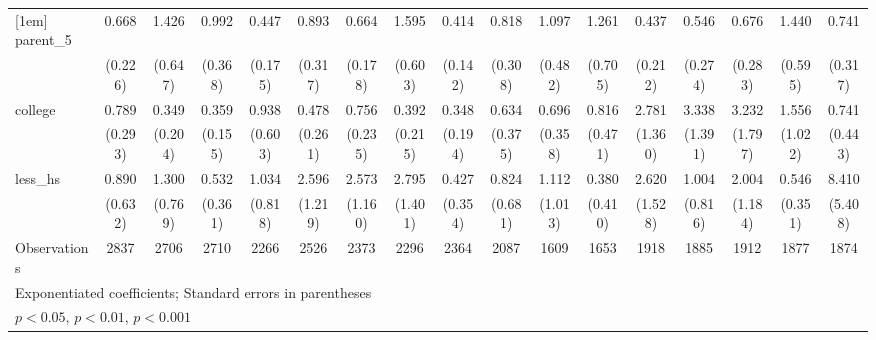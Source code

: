 {\begin{tabular}{l*{16}{c}}
[1em]
parent\_5            &       0.668         &       1.426         &       0.992         &       0.447\sym{*}  &       0.893         &       0.664         &       1.595         &       0.414\sym{*}  &       0.818         &       1.097         &       1.261         &       0.437         &       0.546         &       0.676         &       1.440         &       0.741         \\
                    &     (0.226)         &     (0.647)         &     (0.368)         &     (0.175)         &     (0.317)         &     (0.178)         &     (0.603)         &     (0.142)         &     (0.308)         &     (0.482)         &     (0.705)         &     (0.212)         &     (0.274)         &     (0.283)         &     (0.595)         &     (0.317)         \\
[1em]
college             &       0.789         &       0.349         &       0.359\sym{*}  &       0.938         &       0.478         &       0.756         &       0.392         &       0.348         &       0.634         &       0.696         &       0.816         &       2.781\sym{*}  &       3.338\sym{**} &       3.232\sym{*}  &       1.556         &       0.741         \\
                    &     (0.293)         &     (0.204)         &     (0.155)         &     (0.603)         &     (0.261)         &     (0.235)         &     (0.215)         &     (0.194)         &     (0.375)         &     (0.358)         &     (0.471)         &     (1.360)         &     (1.391)         &     (1.797)         &     (1.022)         &     (0.443)         \\
[1em]
less\_hs             &       0.890         &       1.300         &       0.532         &       1.034         &       2.596\sym{*}  &       2.573\sym{*}  &       2.795\sym{*}  &       0.427         &       0.824         &       1.112         &       0.380         &       2.620         &       1.004         &       2.004         &       0.546         &       8.410\sym{***}\\
                    &     (0.632)         &     (0.769)         &     (0.361)         &     (0.818)         &     (1.219)         &     (1.160)         &     (1.401)         &     (0.354)         &     (0.681)         &     (1.013)         &     (0.410)         &     (1.528)         &     (0.816)         &     (1.184)         &     (0.351)         &     (5.408)         \\
\hline
Observations        &        2837         &        2706         &        2710         &        2266         &        2526         &        2373         &        2296         &        2364         &        2087         &        1609         &        1653         &        1918         &        1885         &        1912         &        1877         &        1874         \\
\hline\hline
\multicolumn{17}{l}{\footnotesize Exponentiated coefficients; Standard errors in parentheses}\\
\multicolumn{17}{l}{\footnotesize \sym{*} \(p<0.05\), \sym{**} \(p<0.01\), \sym{***} \(p<0.001\)}\\
\end{tabular}
}
